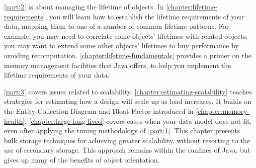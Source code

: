 \begin{comment}
[NMM 20120628 too much E-C diagram detail for intro?]
A data model implementation begins with a conceptual understanding of the
entities and relationships in the model.  This may be an informal understanding,
or it may be formalized in a diagram such as an E-R diagram or a UML class
diagram.  At some point that conceptual model is turned into Java classes that
represent the entities, attributes, and assocations of the model, as well as any
auxiliary structures, such as indexes, needed to access the data.  The example
below shows a simple conceptual model, using a UML class diagram.  A Java
implementation of that model is also shown, using rectangles for classes and
arrows for references.  %
in that it shows
\end{comment}


\autoref{part:2} is about managing the lifetime of objects. In
\autoref{chapter:lifetime-requirements}, you will learn how to establish the
lifetime requirements of your data, mapping them to one of a number
of common lifetime patterns.
For example, you may need to correlate some objects' lifetimes with
related objects; you may want to extend some other objects' lifetimes
to buy performance by avoiding recomputation.
\autoref{chapter:lifetime-fundamentals} provides a primer on the memory
management facilities that Java offers, to help you implement the lifetime
requirements of your data.



\autoref{part:3} covers issues related to scalability.
\autoref{chapter:estimating-scalability} teaches strategies for estimating
how a design will scale up as load increases.
It builds on the Entity-Collection Diagram and Bloat Factor introduced in
\autoref{chapter:memory-health}.
\autoref{chapter:large-long-lived} covers cases when your data model does not fit, even after
applying the tuning methodology of \autoref{part:1}. This chapter presents
bulk storage techniques for achieving greater scalability, without
resorting to the use of secondary storage. This approach remains
within the confines of Java, but gives up many of the benefits of object
orientation.

